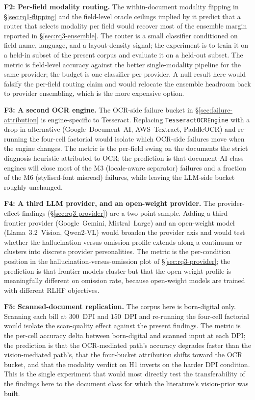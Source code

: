 \textbf{F2: Per-field modality routing.} The within-document modality
flipping in \S\ref{sec:rq1-flipping} and the field-level oracle ceilings
implied by it predict that a router that selects modality per field would
recover most of the ensemble margin reported in
\S\ref{sec:rq3-ensemble}. The router is a small classifier conditioned on
field name, language, and a layout-density signal; the experiment is to
train it on a held-in subset of the present corpus and evaluate it on a
held-out subset. The metric is field-level accuracy against the better
single-modality pipeline for the same provider; the budget is one
classifier per provider. A null result here would falsify the per-field
routing claim and would relocate the ensemble headroom back to provider
ensembling, which is the more expensive option.

\textbf{F3: A second OCR engine.} The OCR-side failure bucket in
\S\ref{sec:failure-attribution} is engine-specific to Tesseract. Replacing
\texttt{TesseractOCREngine} with a drop-in alternative
(Google~Document~AI, AWS~Textract, PaddleOCR) and re-running the four-cell
factorial would isolate which OCR-side failures move when the engine
changes. The metric is the per-field swing on the documents the strict
diagnosis heuristic attributed to OCR; the prediction is that document-AI
class engines will close most of the M3 (locale-aware separator) failures
and a fraction of the M6 (stylised-font misread) failures, while leaving
the LLM-side bucket roughly unchanged.

\textbf{F4: A third LLM provider, and an open-weight provider.} The
provider-effect findings (\S\ref{sec:rq3-provider}) are a two-point
sample. Adding a third frontier provider (Google~Gemini, Mistral~Large) and
an open-weight model (Llama~3.2~Vision, Qwen2-VL) would broaden the
provider axis and would test whether the hallucination-versus-omission
profile extends along a continuum or clusters into discrete provider
personalities. The metric is the per-condition position in the
hallucination-versus-omission plot of \S\ref{sec:rq3-provider}; the
prediction is that frontier models cluster but that the open-weight
profile is meaningfully different on omission rate, because open-weight
models are trained with different RLHF objectives.

\textbf{F5: Scanned-document replication.} The corpus here is born-digital
only. Scanning each bill at $300$~DPI and $150$~DPI and re-running the
four-cell factorial would isolate the scan-quality effect against the
present findings. The metric is the per-cell accuracy delta between
born-digital and scanned input at each DPI; the prediction is that the
OCR-mediated path's accuracy degrades faster than the vision-mediated
path's, that the four-bucket attribution shifts toward the OCR bucket, and
that the modality verdict on H1 inverts on the harder DPI condition.
This is the single experiment that would most directly test the
transferability of the findings here to the document class for which the
literature's vision-prior was built.

